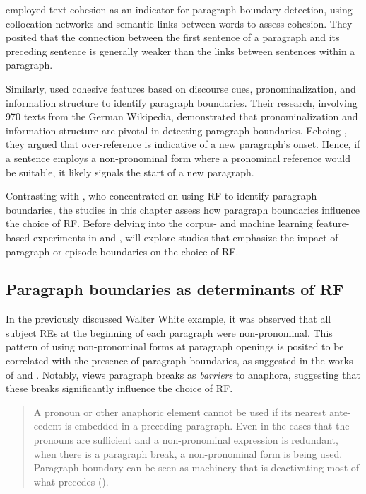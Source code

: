 \citet{Bolshakov2001} employed text cohesion as an indicator for paragraph boundary detection, using collocation networks and semantic links between words to assess cohesion. They posited that the connection between the first sentence of a paragraph and its preceding sentence is generally weaker than the links between sentences within a paragraph. 

Similarly, \citet{filippova-strube-2006-using} used cohesive features based on discourse cues, pronominalization, and information structure to identify paragraph boundaries. Their research, involving 970 texts from the German Wikipedia, demonstrated that pronominalization and information structure are pivotal in detecting paragraph boundaries. Echoing \citet{Stark1988}, they argued that over-reference is indicative of a new paragraph's onset. Hence, if a sentence employs a non-pronominal form where a pronominal reference would be suitable, it likely signals the start of a new paragraph.

Contrasting with \citet{filippova-strube-2006-using}, who concentrated on using RF to identify paragraph boundaries, the studies in this chapter assess how paragraph boundaries influence the choice of RF. Before delving into the corpus- and machine learning feature-based experiments in  and ,  will explore studies that emphasize the impact of paragraph or episode boundaries on the choice of RF.

\subsection{Paragraph boundaries as determinants of RF}\label{sec:ParRef}


In the previously discussed Walter White example, it was observed that all subject REs at the beginning of each paragraph were non-pronominal. This pattern of using non-pronominal forms at paragraph openings is posited to be correlated with the presence of paragraph boundaries, as suggested in the works of \citet{Hinds_1977} and \citet{Hofmann1989}. Notably, \citet{Hofmann1989} views paragraph breaks as \emph{barriers} to anaphora, suggesting that these breaks significantly influence the choice of RF.

 \begin{quote}
 	A pronoun or other anaphoric element cannot be used if its nearest ante-cedent is embedded in a preceding paragraph. Even in the cases that the pronouns are sufficient and a non-pronominal expression is redundant, when there is a paragraph break, a non-pronominal form is being used. Paragraph boundary can be seen as machinery that is deactivating most of what precedes (\citeyear[241]{Hofmann1989}). 
 	
 \end{quote}

